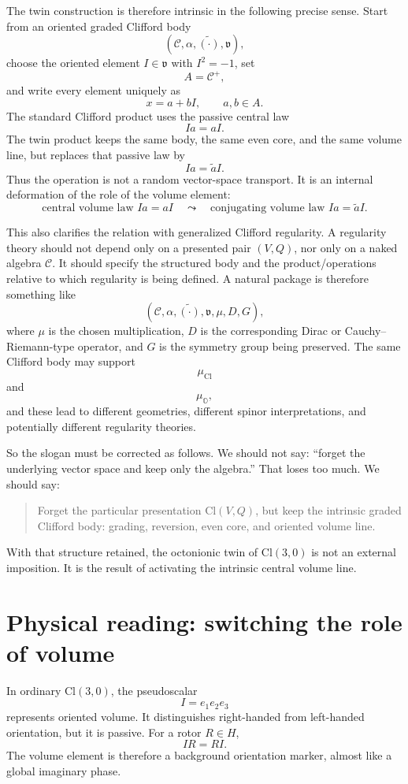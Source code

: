 \documentclass[11pt]{article}
\newcommand{\Cl}{\mathrm{Cl}}
\newcommand{\OO}{\mathbb O}
\begin{document}
The twin construction is therefore intrinsic in the following precise sense.
Start from an oriented graded Clifford body
\[
(\mathcal C,\alpha,\widetilde{(\cdot)},\mathfrak v),
\]
choose the oriented element $I\in\mathfrak v$ with $I^2=-1$, set
\[
A=\mathcal C^+,
\]
and write every element uniquely as
\[
x=a+bI,
\qquad a,b\in A.
\]
The standard Clifford product uses the passive central law
\[
Ia=aI.
\]
The twin product keeps the same body, the same even core, and the same volume
line, but replaces that passive law by
\[
Ia=\widetilde a I.
\]
Thus the operation is not a random vector-space transport. It is an internal
deformation of the role of the volume element:
\[
\boxed{
\text{central volume law } Ia=aI
\quad\leadsto\quad
\text{conjugating volume law } Ia=\widetilde a I.
}
\]

This also clarifies the relation with generalized Clifford regularity. A
regularity theory should not depend only on a presented pair $(V,Q)$, nor only
on a naked algebra $\mathcal C$. It should specify the structured body and the
product/operations relative to which regularity is being defined. A natural
package is therefore something like
\[
(\mathcal C,\alpha,\widetilde{(\cdot)},\mathfrak v,\mu,D,G),
\]
where $\mu$ is the chosen multiplication, $D$ is the corresponding Dirac or
Cauchy--Riemann-type operator, and $G$ is the symmetry group being preserved.
The same Clifford body may support
\[
\mu_{\Cl}
\]
and
\[
\mu_{\OO},
\]
and these lead to different geometries, different spinor interpretations, and
potentially different regularity theories.

So the slogan must be corrected as follows. We should not say: ``forget the
underlying vector space and keep only the algebra.'' That loses too much. We
should say:
\begin{quote}
Forget the particular presentation $\Cl(V,Q)$, but keep the intrinsic graded
Clifford body: grading, reversion, even core, and oriented volume line.
\end{quote}
With that structure retained, the octonionic twin of $\Cl(3,0)$ is not an
external imposition. It is the result of activating the intrinsic central
volume line.

\section{Physical reading: switching the role of volume}

In ordinary $\Cl(3,0)$, the pseudoscalar
\[
I=e_1e_2e_3
\]
represents oriented volume. It distinguishes right-handed from left-handed
orientation, but it is passive. For a rotor $R\in H$,
\[
IR=RI.
\]
The volume element is therefore a background orientation marker, almost like a
global imaginary phase.
\end{document}
